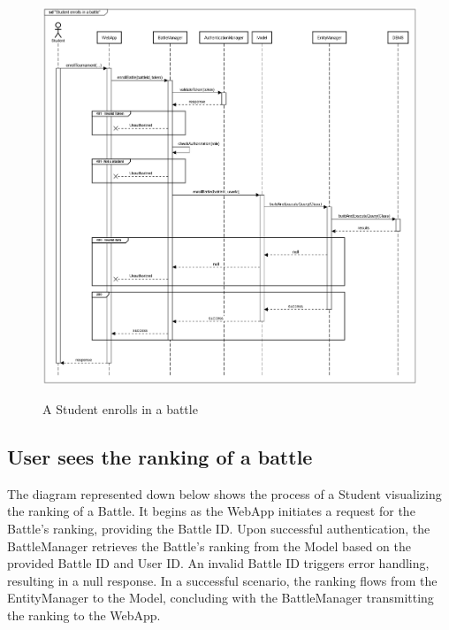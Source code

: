 \documentclass{Configuration_Files/Template}
\begin{document}
\begin{figure}[H]
\centering
\includegraphics[scale = 0.33]{Images/diagrams/sequences/enrollBattle.png}\\
\caption{A Student enrolls in a battle}
\end{figure}

\subsection{User sees the ranking of a battle}

The diagram represented down below shows the process of a Student visualizing the ranking of a Battle. It begins as the WebApp initiates a request for the Battle's ranking, providing the Battle ID. Upon successful authentication, the BattleManager retrieves the Battle's ranking from the Model based on the provided Battle ID and User ID. An invalid Battle ID triggers error handling, resulting in a null response. In a successful scenario, the ranking flows from the EntityManager to the Model, concluding with the BattleManager transmitting the ranking to the WebApp.
\end{document}
